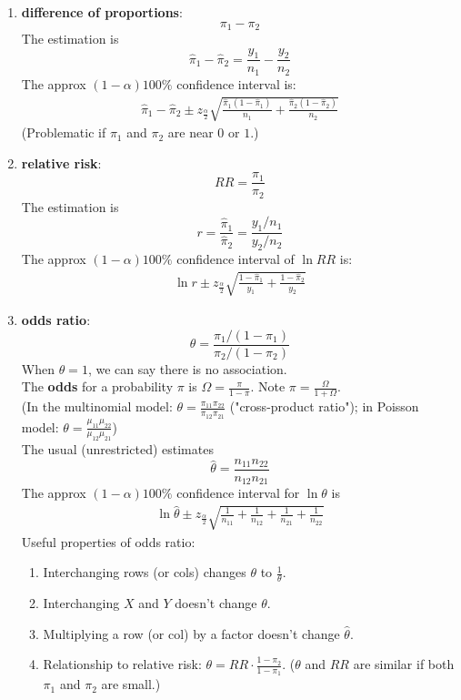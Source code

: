 \documentclass[11pt]{elegantbook}
\begin{document}
\begin{enumerate}
    \item \textbf{difference of proportions}: $$\pi_1-\pi_2$$
    The estimation is $$\hat{\pi}_1-\hat{\pi}_2=\frac{y_1}{n_1}-\frac{y_2}{n_2}$$
    The approx $(1-\alpha)100\%$ confidence interval is:
    \begin{equation}
        \begin{aligned}
            \hat{\pi}_1-\hat{\pi}_2\pm z_{\frac{\alpha}{2}}\sqrt{\frac{\hat{\pi}_1(1-\hat{\pi}_1)}{n_1}+\frac{\hat{\pi}_2(1-\hat{\pi}_2)}{n_2}}
        \end{aligned}
        \nonumber
    \end{equation}
    (Problematic if $\pi_1$ and $\pi_2$ are near $0$ or $1$.)
    \item \textbf{relative risk}: $$RR=\frac{\pi_1}{\pi_2}$$
    The estimation is $$r=\frac{\hat{\pi}_1}{\hat{\pi}_2}=\frac{y_1/n_1}{y_2/n_2}$$
    The approx $(1-\alpha)100\%$ confidence interval of $\ln RR$ is:
    \begin{equation}
        \begin{aligned}
            \ln r\pm z_{\frac{\alpha}{2}}\sqrt{\frac{1-\hat{\pi}_1}{y_1}+\frac{1-\hat{\pi}_2}{y_2}}
        \end{aligned}
        \nonumber
    \end{equation}
    \item \textbf{odds ratio}: $$\theta=\frac{\pi_1/(1-\pi_1)}{\pi_2/(1-\pi_2)}$$
    When $\theta=1$, we can say there is no association.\\
    The \textbf{odds} for a probability $\pi$ is $\Omega=\frac{\pi}{1-\pi}$. Note $\pi=\frac{\Omega}{1+\Omega}$.\\
    (In the multinomial model: $\theta=\frac{\pi_{11}\pi_{22}}{\pi_{12}\pi_{21}}$ ("cross-product ratio"); in Poisson model: $\theta=\frac{\mu_{11}\mu_{22}}{\mu_{12}\mu_{21}}$)\\
    The usual (unrestricted) estimates $$\hat{\theta}=\frac{n_{11}n_{22}}{n_{12}n_{21}}$$
    The approx $(1-\alpha)100\%$ confidence interval for $\ln\theta$ is
    \begin{equation}
        \begin{aligned}
            \ln\hat{\theta}\pm z_{\frac{\alpha}{2}}\sqrt{\frac{1}{n_{11}}+\frac{1}{n_{12}}+\frac{1}{n_{21}}+\frac{1}{n_{22}}}
        \end{aligned}
        \nonumber
    \end{equation}
    Useful properties of odds ratio:
    \begin{enumerate}[(1)]
        \item Interchanging rows (or cols) changes $\theta$ to $\frac{1}{\theta}$.
        \item Interchanging $X$ and $Y$ doesn't change $\theta$.
        \item Multiplying a row (or col) by a factor doesn't change $\hat{\theta}$.
        \item Relationship to relative risk: $\theta=RR\cdot\frac{1-\pi_2}{1-\pi_1}$. ($\theta$ and $RR$ are similar if both $\pi_1$ and $\pi_2$ are small.)
    \end{enumerate}
\end{enumerate}
\end{document}
